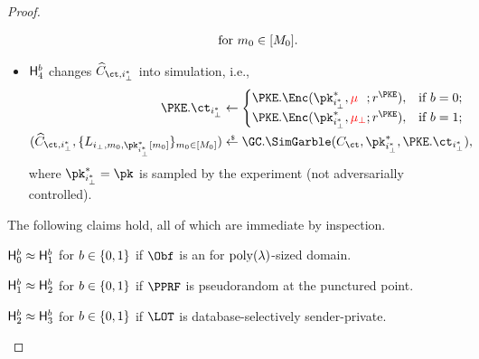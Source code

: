 \begin{proof}
\begin{itemize}
\begin{align*}
\qquad\textup{for }m_0\in[M_0].
\end{align*}
\item $\Hyb_4^b$ changes $\widehat{C}_{\ct,i_\bot^\ast}$ into simulation, i.e.,
\begin{align*}
\PKE.\ct_{i_\bot^\ast}&{}\gets\begin{cases}
\PKE.\Enc(\pk^\ast_{i_\bot^\ast},{\color{red}\mu_{\phantom{\bot}}};r^\PKE),
&\textup{if }b=0;\\
\PKE.\Enc(\pk^\ast_{i_\bot^\ast},{\color{red}\mu_\bot};r^\PKE),
&\textup{if }b=1;
\end{cases}\\
(\widehat{C}_{\ct,i_\bot^\ast},\{L_{i_\bot,m_0,\pk^\ast_{i_\bot^\ast}[m_0]}\}_{m_0\in[M_0]})
&{}\draws\GC.\SimGarble(C_\ct,\pk^\ast_{i_\bot^\ast},\PKE.\ct_{i_\bot^\ast}),
\end{align*}
where ${\pk^\ast_{i_\bot^\ast}=\pk}$ is sampled by the experiment
(not adversarially controlled).
\end{itemize}
The following claims hold, all of which are immediate by inspection.

\begin{claim}\label{clm:index-hiding-hyb01}
${\Hyb_0^b\approx\Hyb_1^b}$ for ${b\in{\{0,1\}}}$
if $\Obf$ is an {\iO} for $\operatorname{poly}(\lambda)$-sized domain.
\end{claim}

\begin{claim}\label{clm:index-hiding-hyb12}
${\Hyb_1^b\approx\Hyb_2^b}$ for ${b\in{\{0,1\}}}$
if $\PPRF$ is pseudorandom at the punctured point.
\end{claim}

\begin{claim}\label{clm:index-hiding-hyb23}
${\Hyb_2^b\approx\Hyb_3^b}$ for ${b\in{\{0,1\}}}$
if $\LOT$ is database-selectively sender-private.
\end{claim}


\end{proof}
